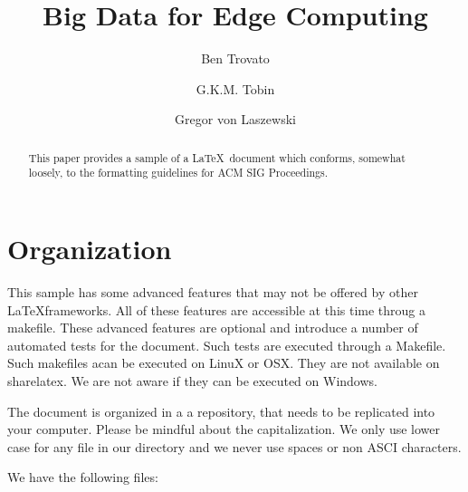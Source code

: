 \title{Big Data for Edge Computing}


\author{Ben Trovato}

\author{G.K.M. Tobin}

\author{Gregor von Laszewski}


\renewcommand{\shortauthors}{G. v. Laszewski}


\begin{abstract}
This paper provides a sample of a \LaTeX\ document which conforms,
somewhat loosely, to the formatting guidelines for
ACM SIG Proceedings.
\end{abstract}



\maketitle


\section{Organization}

This sample has some advanced features that may not be offered by
other \LaTeX frameworks. All of these features are accessible at this
time throug a makefile. These advanced features are optional and
introduce a number of automated tests for the document. Such tests are
executed through a Makefile. Such makefiles acan be executed on LinuX
or OSX. They are not available on sharelatex. We are not aware if they
can be executed on Windows.

The document is organized in a a repository, that needs to be
replicated into your computer. Please be mindful about the
capitalization. We only use lower case for any file in our directory
and we never use spaces or non ASCI characters.

We have the following files:

